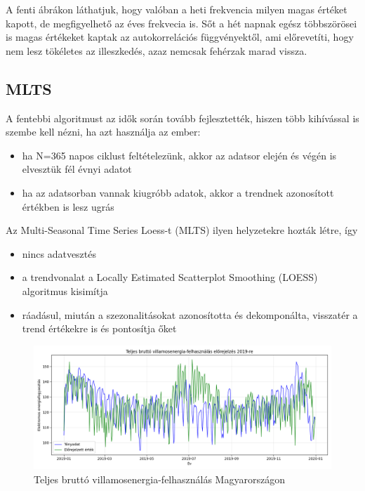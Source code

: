 A fenti ábrákon láthatjuk, hogy valóban a heti frekvencia milyen magas értéket kapott, de
megfigyelhető az éves frekvecia is. Sőt a hét napnak egész többszörösei is magas értékeket kaptak
az autokorrelációs függvényektől, ami előrevetíti, hogy nem lesz tökéletes az illeszkedés, azaz
nemcsak fehérzak marad vissza.

\subsection{MLTS}

A fentebbi algoritmust az idők során tovább fejlesztették, hiszen több kihívással is szembe kell
nézni, ha azt használja az ember:

\begin{itemize}
    \item ha N=365 napos ciklust feltételezünk, akkor az adatsor elején és végén is elvesztük fél évnyi
          adatot
    \item ha az adatsorban vannak kiugróbb adatok, akkor a trendnek azonosított értékben is lesz ugrás
\end{itemize}

Az Multi-Seasonal Time Series Loess-t (MLTS) ilyen helyzetekre hozták létre, így

\begin{itemize}
    \item nincs adatvesztés
    \item a trendvonalat a Locally Estimated Scatterplot Smoothing (LOESS) algoritmus kisimítja
    \item ráadásul, miután a szezonalitásokat azonosította és dekomponálta, visszatér a trend értékekre is és
          pontosítja őket
\end{itemize}

\begin{figure}[htbp]
    \centering
    \includegraphics[width=1\textwidth, height=0.8\textheight, keepaspectratio]{../figures/mavir_daily_forecast.png}
    \caption{Teljes bruttó villamosenergia-felhasználás Magyarországon}\label{fig:mavir_daily_forecast}
\end{figure}

